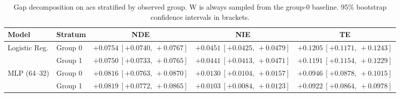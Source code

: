 \begin{table}[htbp]
  \centering
  \caption{Gap decomposition on acs stratified by observed group. W is always sampled from the group-0 baseline. 95\% bootstrap confidence intervals in brackets.}
  \label{tab:acs_gap_stratified}
  \begin{tabular}{llccc}
    \toprule
    Model & Stratum & NDE & NIE & TE \\
    \midrule
    Logistic Reg. & Group 0 & $+0.0754\ [+0.0740,\ +0.0767]$ & $+0.0451\ [+0.0425,\ +0.0479]$ & $+0.1205\ [+0.1171,\ +0.1243]$ \\
     & Group 1 & $+0.0750\ [+0.0733,\ +0.0765]$ & $+0.0441\ [+0.0413,\ +0.0471]$ & $+0.1191\ [+0.1154,\ +0.1229]$ \\
    \midrule
    MLP (64--32) & Group 0 & $+0.0816\ [+0.0763,\ +0.0870]$ & $+0.0130\ [+0.0104,\ +0.0157]$ & $+0.0946\ [+0.0878,\ +0.1015]$ \\
     & Group 1 & $+0.0819\ [+0.0772,\ +0.0865]$ & $+0.0103\ [+0.0084,\ +0.0123]$ & $+0.0922\ [+0.0864,\ +0.0978]$ \\
    \bottomrule
  \end{tabular}
\end{table}